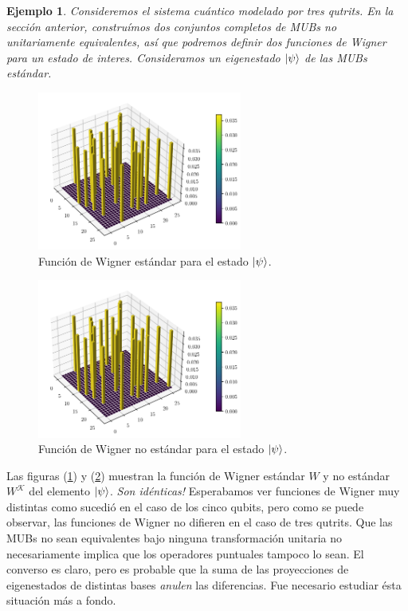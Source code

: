 \documentclass[a4paper,11pt]{report}
\newtheorem{example}{Ejemplo}
\begin{document}
  \clearpage
  \begin{example}
    Consideremos el sistema cuántico modelado por tres
    qutrits. En la sección anterior, construímos dos
    conjuntos completos de MUBs no unitariamente
    equivalentes, así que podremos definir dos funciones de
    Wigner para un estado de interes. Consideramos un
    eigenestado $\ket{\psi}$  de las MUBs estándar.
  \end{example}
  \begin{figure}[ht]
    \centering
    \includegraphics[width=0.6\textwidth]{
    imgs/wigner-standard-3-3-s1.png}
    \caption{Función de Wigner estándar para el estado
    $\ket{\psi}$.}
    \label{fig:wigner-standard-3-3-s1}
  \end{figure}
  \begin{figure}[ht]
    \centering
    \includegraphics[width=0.6\textwidth]{
    imgs/wigner-standard-3-3-s1.png}
    \caption{Función de Wigner no estándar para el estado
    $\ket{\psi}$.}
    \label{fig:wigner-kantor-3-3-s1}
  \end{figure}
  Las figuras (\ref{fig:wigner-standard-3-3-s1}) y
  (\ref{fig:wigner-kantor-3-3-s1}) muestran la función de
  Wigner estándar $W$ y no estándar $W^{\mathcal K}$ del
  elemento $\ket{\psi}$. \textit{Son idénticas!} Esperabamos
  ver funciones de Wigner muy distintas como sucedió en el
  caso de los cinco qubits, pero como se puede observar, las
  funciones de Wigner no difieren en el caso de tres
  qutrits. Que las MUBs no sean equivalentes bajo ninguna
  transformación unitaria no necesariamente implica que los
  operadores puntuales tampoco lo sean.  El converso es
  claro, pero es probable que la suma de las proyecciones
  de eigenestados de distintas bases \textit{anulen} las
  diferencias. Fue necesario estudiar ésta situación más a
  fondo. 
\end{document}
